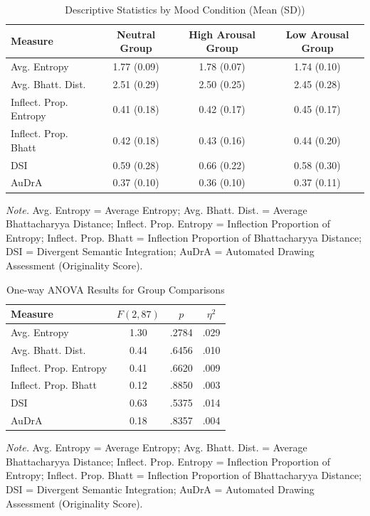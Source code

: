 \documentclass[../MA_Thesis.tex]{subfiles}
\begin{document}
\begin{table}[H]
\centering
\begin{threeparttable}
\caption{Descriptive Statistics by Mood Condition (Mean (SD))}
\label{tab:descriptive_stats}
\begin{tabular}{lccc}
\toprule
\textbf{Measure} & \textbf{Neutral Group} & \textbf{High Arousal Group} & \textbf{Low Arousal Group} \\
\midrule
Avg. Entropy & 1.77 (0.09) & 1.78 (0.07) & 1.74 (0.10) \\
Avg. Bhatt. Dist. & 2.51 (0.29) & 2.50 (0.25) & 2.45 (0.28) \\
Inflect. Prop. Entropy & 0.41 (0.18) & 0.42 (0.17) & 0.45 (0.17) \\
Inflect. Prop. Bhatt & 0.42 (0.18) & 0.43 (0.16) & 0.44 (0.20) \\
DSI & 0.59 (0.28) & 0.66 (0.22) & 0.58 (0.30) \\
AuDrA & 0.37 (0.10) & 0.36 (0.10) & 0.37 (0.11) \\
\bottomrule
\end{tabular}
\begin{tablenotes}[flushleft]
\small
\item \textit{Note.} Avg. Entropy = Average Entropy; Avg. Bhatt. Dist. = Average Bhattacharyya Distance; Inflect. Prop. Entropy = Inflection Proportion of Entropy; Inflect. Prop. Bhatt = Inflection Proportion of Bhattacharyya Distance; DSI = Divergent Semantic Integration; AuDrA = Automated Drawing Assessment (Originality Score).
\end{tablenotes}
\end{threeparttable}
\end{table}

\begin{table}[H]
\centering
\begin{threeparttable}
\caption{One-way ANOVA Results for Group Comparisons}
\label{tab:anova_results}
\begin{tabular}{lccc}
\toprule
\textbf{Measure} & \textbf{$F(2, 87)$} & \textbf{$p$} & \textbf{$\eta^2$} \\
\midrule
Avg. Entropy & 1.30 & .2784 & .029 \\
Avg. Bhatt. Dist. & 0.44 & .6456 & .010 \\
Inflect. Prop. Entropy & 0.41 & .6620 & .009 \\
Inflect. Prop. Bhatt & 0.12 & .8850 & .003 \\
DSI & 0.63 & .5375 & .014 \\
AuDrA & 0.18 & .8357 & .004 \\
\bottomrule
\end{tabular}
\begin{tablenotes}[flushleft]
\small
\item \textit{Note.} Avg. Entropy = Average Entropy; Avg. Bhatt. Dist. = Average Bhattacharyya Distance; Inflect. Prop. Entropy = Inflection Proportion of Entropy; Inflect. Prop. Bhatt = Inflection Proportion of Bhattacharyya Distance; DSI = Divergent Semantic Integration; AuDrA = Automated Drawing Assessment (Originality Score).
\end{tablenotes}
\end{threeparttable}
\end{table}
\end{document}
